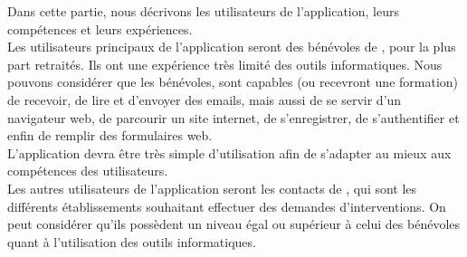 Dans cette partie, nous décrivons les utilisateurs de l'application, leurs compétences et leurs expériences.\\

Les utilisateurs principaux de l'application seront des bénévoles de \nomClient{}, pour la plus part retraités. Ils ont une expérience très limité des outils informatiques. Nous pouvons considérer que les bénévoles, sont capables (ou recevront une formation) de recevoir, de lire et d'envoyer des emails, mais aussi de se servir d'un navigateur web, de parcourir un site internet, de s'enregistrer, de s'authentifier et enfin de remplir des formulaires web.\\

L'application devra être très simple d'utilisation afin de s'adapter au mieux aux compétences des utilisateurs.\\

Les autres utilisateurs de l'application seront les contacts de \nomClient{}, qui sont les différents établissements souhaitant effectuer des demandes d'interventions. On peut considérer qu'ils possèdent un niveau égal ou supérieur à celui des bénévoles quant à l'utilisation des outils informatiques.